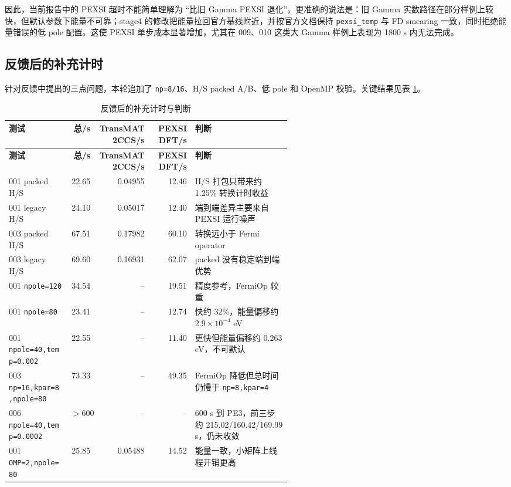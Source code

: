 \documentclass[a4paper,11pt]{article}
\newcommand{\code}[1]{\texttt{#1}}
\begin{document}
因此，当前报告中的 PEXSI 超时不能简单理解为 ``比旧 Gamma PEXSI 退化''。更准确的说法是：旧 Gamma 实数路径在部分样例上较快，但默认参数下能量不可靠；stage4 的修改把能量拉回官方基线附近，并按官方文档保持 \code{pexsi\_temp} 与 FD smearing 一致，同时拒绝能量错误的低 pole 配置。这使 PEXSI 单步成本显著增加，尤其在 009、010 这类大 Gamma 样例上表现为 1800 s 内无法完成。

\subsection{反馈后的补充计时}

针对反馈中提出的三点问题，本轮追加了 \code{np=8/16}、H/S packed A/B、低 pole 和 OpenMP 校验。关键结果见表 \ref{tab:feedback-timing}。

{\scriptsize
\begin{longtable}{@{}p{0.22\linewidth}r r r p{0.34\linewidth}@{}}
\caption{反馈后的补充计时与判断}
\label{tab:feedback-timing}\\
\toprule
\textbf{测试} & \textbf{总/s} & \textbf{TransMAT2CCS/s} & \textbf{PEXSIDFT/s} & \textbf{判断}\\
\midrule
\endfirsthead
\toprule
\textbf{测试} & \textbf{总/s} & \textbf{TransMAT2CCS/s} & \textbf{PEXSIDFT/s} & \textbf{判断}\\
\midrule
\endhead
001 packed H/S & 22.65 & 0.04955 & 12.46 & H/S 打包只带来约 1.25\% 转换计时收益\\
001 legacy H/S & 24.10 & 0.05017 & 12.40 & 端到端差异主要来自 PEXSI 运行噪声\\
003 packed H/S & 67.51 & 0.17982 & 60.10 & 转换远小于 Fermi operator\\
003 legacy H/S & 69.60 & 0.16931 & 62.07 & packed 没有稳定端到端优势\\
001 \code{npole=120} & 34.54 & -- & 19.51 & 精度参考，FermiOp 较重\\
001 \code{npole=80} & 23.41 & -- & 12.74 & 快约 32\%，能量偏移约 \(2.9\times10^{-4}\) eV\\
001 \code{npole=40,temp=0.002} & 22.55 & -- & 11.40 & 更快但能量偏移约 0.263 eV，不可默认\\
003 \code{np=16,kpar=8,npole=80} & 73.33 & -- & 49.35 & FermiOp 降低但总时间仍慢于 \code{np=8,kpar=4}\\
006 \code{npole=40,temp=0.0002} & \(>600\) & -- & -- & 600 s 到 PE3，前三步约 215.02/160.42/169.99 s，仍未收敛\\
001 \code{OMP=2,npole=80} & 25.85 & 0.05488 & 14.52 & 能量一致，小矩阵上线程开销更高\\
\bottomrule
\end{longtable}
}
\end{document}
